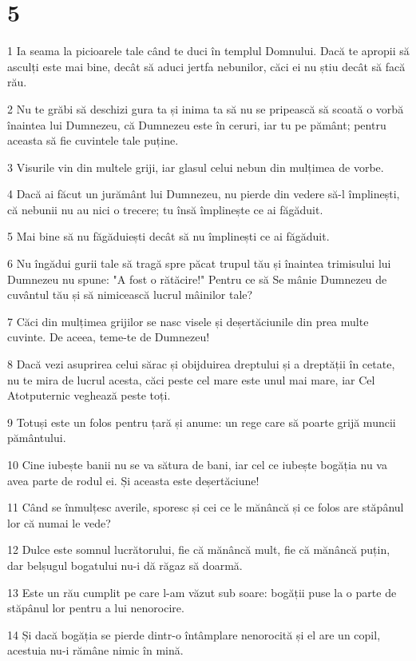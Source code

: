 \chapter{5}

\par 1 Ia seama la picioarele tale când te duci în templul Domnului. Dacă te apropii să asculți este mai bine, decât să aduci jertfa nebunilor, căci ei nu știu decât să facă rău.
\par 2 Nu te grăbi să deschizi gura ta și inima ta să nu se pripească să scoată o vorbă înaintea lui Dumnezeu, că Dumnezeu este în ceruri, iar tu pe pământ; pentru aceasta să fie cuvintele tale puține.
\par 3 Visurile vin din multele griji, iar glasul celui nebun din mulțimea de vorbe.
\par 4 Dacă ai făcut un jurământ lui Dumnezeu, nu pierde din vedere să-l împlinești, că nebunii nu au nici o trecere; tu însă împlinește ce ai făgăduit.
\par 5 Mai bine să nu făgăduiești decât să nu împlinești ce ai făgăduit.
\par 6 Nu îngădui gurii tale să tragă spre păcat trupul tău și înaintea trimisului lui Dumnezeu nu spune: "A fost o rătăcire!" Pentru ce să Se mânie Dumnezeu de cuvântul tău și să nimicească lucrul mâinilor tale?
\par 7 Căci din mulțimea grijilor se nasc visele și deșertăciunile din prea multe cuvinte. De aceea, teme-te de Dumnezeu!
\par 8 Dacă vezi asuprirea celui sărac și obijduirea dreptului și a dreptății în cetate, nu te mira de lucrul acesta, căci peste cel mare este unul mai mare, iar Cel Atotputernic veghează peste toți.
\par 9 Totuși este un folos pentru țară și anume: un rege care să poarte grijă muncii pământului.
\par 10 Cine iubește banii nu se va sătura de bani, iar cel ce iubește bogăția nu va avea parte de rodul ei. Și aceasta este deșertăciune!
\par 11 Când se înmulțesc averile, sporesc și cei ce le mănâncă și ce folos are stăpânul lor că numai le vede?
\par 12 Dulce este somnul lucrătorului, fie că mănâncă mult, fie că mănâncă puțin, dar belșugul bogatului nu-i dă răgaz să doarmă.
\par 13 Este un rău cumplit pe care l-am văzut sub soare: bogății puse la o parte de stăpânul lor pentru a lui nenorocire.
\par 14 Și dacă bogăția se pierde dintr-o întâmplare nenorocită și el are un copil, acestuia nu-i rămâne nimic în mină.
